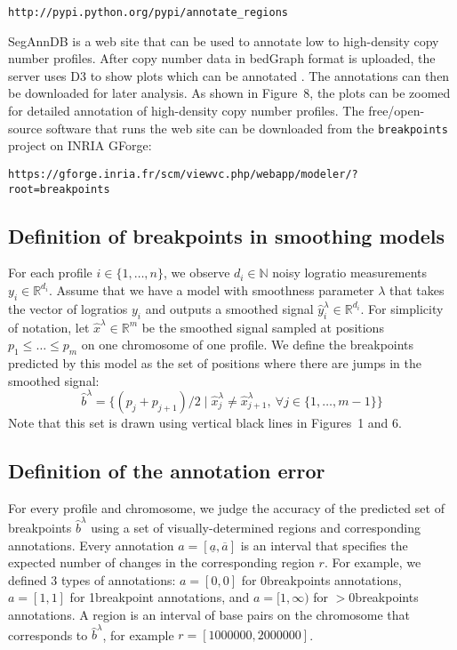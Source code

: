 \documentclass[10pt]{bmc_article}
\newcommand{\citep}[1]{\cite{#1}}
\newcommand{\url}[1]{\texttt{#1}}
\newcommand{\RR}{\mathbb R}
\newcommand{\NN}{\mathbb N}
\newenvironment{bmcformat}{\begin{raggedright}\baselineskip20pt\sloppy\setboolean{publ}{false}}{\end{raggedright}\baselineskip20pt\sloppy}
\begin{document}
\begin{bmcformat}
\url{http://pypi.python.org/pypi/annotate_regions}

SegAnnDB is a web site that can be used to annotate low to
high-density copy number profiles. After copy number data in bedGraph
format is uploaded, the server uses D3 to show plots which can be
annotated \citep{d3}. The annotations can then be downloaded for later
analysis. As shown in Figure~8, the plots can be zoomed for detailed
annotation of high-density copy number profiles. The free/open-source
software that runs the web site can be downloaded from the
\texttt{breakpoints} project on INRIA GForge:

\url{https://gforge.inria.fr/scm/viewvc.php/webapp/modeler/?root=breakpoints}



\subsection*{Definition of breakpoints in smoothing models}

For each profile $i\in\{1,\dots,n\}$, we observe $d_i\in\NN$ noisy
logratio measurements $y_i\in\RR^{d_i}$. Assume that we have a model
with smoothness parameter $\lambda$ that takes the vector of logratios
$y_i$ and outputs a smoothed signal $\hat
y_i^\lambda\in\RR^{d_i}$. For simplicity of notation, let $\hat
x^\lambda\in\RR^m$ be the smoothed signal sampled at positions $p_1\leq \dots
\leq p_m$ on one chromosome of one profile. We define the breakpoints
predicted by this model as the set of positions where there are jumps
in the smoothed signal:
\begin{equation}
  \label{eq:predicted}
  \hat b^\lambda = \big\{
(p_j+p_{j+1})/2
\mid
\hat x_{j}^\lambda\neq
\hat x_{j+1}^\lambda,
\ \forall j\in\{1,\dots,m-1\}
\big\}
\end{equation}
Note that this set is drawn using vertical black lines in Figures~1
and 6.

\subsection*{Definition of the annotation error}

For every profile and chromosome, we judge the accuracy of the
predicted set of breakpoints $\hat b^\lambda$ using a set of
visually-determined regions and corresponding annotations. Every
annotation $a=[\underline a,\overline a]$ is an interval that
specifies the expected number of changes in the corresponding region
$r$. For example, we defined 3 types of annotations: $a=[0,0]$ for
0breakpoints annotations, $a=[1,1]$ for 1breakpoint annotations, and
$a=[1,\infty)$ for $>$0breakpoints annotations. A region is an
interval of base pairs on the chromosome that corresponds to $\hat
b^\lambda$, for example $r=[1000000,2000000]$.


\end{bmcformat}
\end{document}
